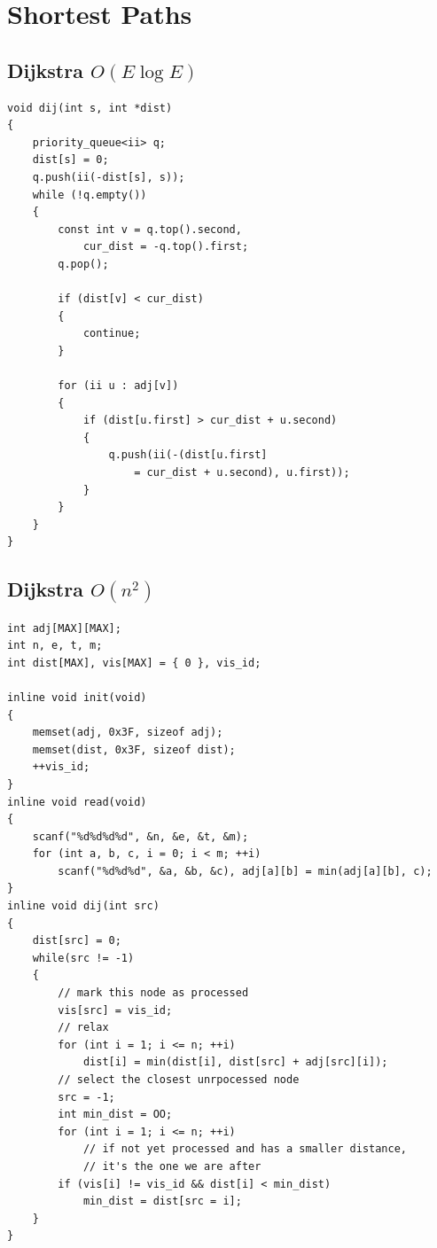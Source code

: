 \documentclass[12pt]{book}
\begin{document}
\chapter{Shortest Paths}
\section{Dijkstra $O(E\log E)$}
\begin{verbatim}
void dij(int s, int *dist)
{
	priority_queue<ii> q;
	dist[s] = 0;
	q.push(ii(-dist[s], s));
	while (!q.empty())
	{
		const int v = q.top().second,
			cur_dist = -q.top().first;
		q.pop();
		
		if (dist[v] < cur_dist)
		{
			continue;
		}

		for (ii u : adj[v])
		{
			if (dist[u.first] > cur_dist + u.second)
			{
				q.push(ii(-(dist[u.first]
					= cur_dist + u.second), u.first));
			}
		}
	}
}
\end{verbatim}
\section{Dijkstra $O(n^2)$}
\begin{verbatim}
int adj[MAX][MAX];
int n, e, t, m;
int dist[MAX], vis[MAX] = { 0 }, vis_id;

inline void init(void)
{
	memset(adj, 0x3F, sizeof adj);
	memset(dist, 0x3F, sizeof dist);
	++vis_id;
}
inline void read(void)
{
	scanf("%d%d%d%d", &n, &e, &t, &m);
	for (int a, b, c, i = 0; i < m; ++i)
		scanf("%d%d%d", &a, &b, &c), adj[a][b] = min(adj[a][b], c);
}
inline void dij(int src)
{
	dist[src] = 0;
	while(src != -1)
	{
		// mark this node as processed
		vis[src] = vis_id;
		// relax
		for (int i = 1; i <= n; ++i)
			dist[i] = min(dist[i], dist[src] + adj[src][i]);
		// select the closest unrpocessed node
		src = -1;
		int min_dist = OO;
		for (int i = 1; i <= n; ++i)
			// if not yet processed and has a smaller distance,
			// it's the one we are after
		if (vis[i] != vis_id && dist[i] < min_dist)
			min_dist = dist[src = i];
	}
}
\end{verbatim}
\end{document}
